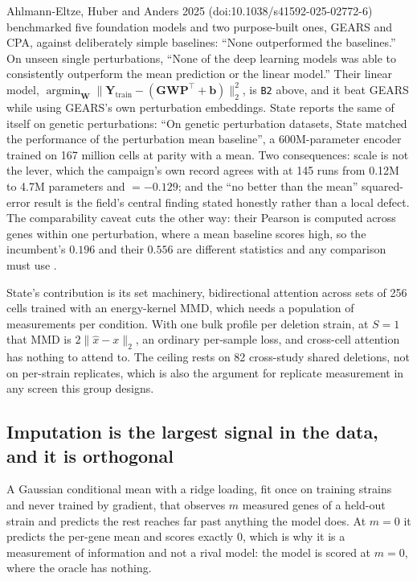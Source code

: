  Ahlmann-Eltze, Huber and Anders 2025
(doi:10.1038/s41592-025-02772-6) benchmarked five foundation models and two purpose-built
ones, GEARS and CPA, against deliberately simple baselines: ``None outperformed the
baselines.'' On unseen single perturbations, ``None of the deep learning models was able to
consistently outperform the mean prediction or the linear model.'' Their linear model,
$\operatorname{argmin}_{\mathbf W} \|\mathbf Y_{\mathrm{train}} - (\mathbf{G}\mathbf{W}\mathbf{P}^{\top} + \pmb b)\|_2^2$,
is \texttt{B2} above, and it beat GEARS while using GEARS's own perturbation embeddings.
State reports the same of itself on genetic perturbations: ``On genetic perturbation
datasets, State matched the performance of the perturbation mean baseline'', a
600M-parameter encoder trained on 167 million cells at parity with a mean. Two
consequences: scale is not the lever, which the campaign's own record agrees with at 145
runs from 0.12M to 4.7M parameters and  $= -0.129$; and
the ``no better than the mean'' squared-error result is the field's central finding stated
honestly rather than a local defect. The comparability caveat cuts the other way: their
Pearson is computed across genes within one perturbation, where a mean baseline scores
high, so the incumbent's $0.196$ and their $0.556$ are different statistics and any
comparison must use .

 State's contribution is its set machinery, bidirectional
attention across sets of 256 cells trained with an energy-kernel MMD, which needs a
population of measurements per condition. With one bulk profile per deletion strain, at
$S = 1$ that MMD is $2\|\hat x - x\|_2$, an ordinary per-sample loss, and cross-cell
attention has nothing to attend to. The ceiling rests on 82 cross-study shared deletions,
not on per-strain replicates, which is also the argument for replicate measurement in any
screen this group designs.

\subsection{Imputation is the largest signal in the data, and it is orthogonal
}
\label{sec:strand-oracle}

A Gaussian conditional mean with a ridge loading, fit once on training strains and never
trained by gradient, that observes $m$ measured genes of a held-out strain and predicts the
rest reaches far past anything the model does. At $m = 0$ it predicts the per-gene mean
and scores exactly $0$, which is why it is a measurement of information and not a rival
model: the model is scored at $m = 0$, where the oracle has nothing.

